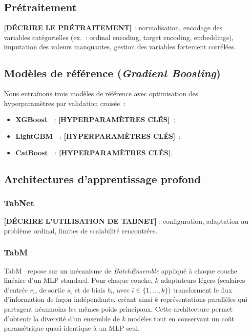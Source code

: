 \documentclass[conference]{IEEEtran}
\begin{document}
\subsection{Prétraitement}

\textbf{[DÉCRIRE LE PRÉTRAITEMENT]} : normalisation, encodage des variables catégorielles (ex.~: ordinal encoding, target encoding, embeddings), imputation des valeurs manquantes, gestion des variables fortement corrélées.

\subsection{Modèles de référence (\textit{Gradient Boosting})}

Nous entraînons trois modèles de référence avec optimisation des hyperparamètres par
validation croisée~:
\begin{itemize}
  \item \textbf{XGBoost}~\cite{chen2016xgboost}~: \textbf{[HYPERPARAMÈTRES CLÉS]}~;
  \item \textbf{LightGBM}~\cite{ke2017lightgbm}~: \textbf{[HYPERPARAMÈTRES CLÉS]}~;
  \item \textbf{CatBoost}~\cite{prokhorenkova2018catboost}~: \textbf{[HYPERPARAMÈTRES CLÉS]}.
\end{itemize}

\subsection{Architectures d'apprentissage profond}

\subsubsection{TabNet}
\textbf{[DÉCRIRE L'UTILISATION DE TABNET]} : configuration, adaptation au problème
ordinal, limites de scalabilité rencontrées.

\subsubsection{TabM}
TabM~\cite{gorishniy2024tabm} repose sur un mécanisme de \textit{BatchEnsemble} appliqué
à chaque couche linéaire d'un MLP standard. Pour chaque couche, $k$ adaptateurs légers
(scalaires d'entrée $r_i$, de sortie $s_i$ et de biais $b_i$, avec $i \in \{1,\ldots,k\}$)
transforment le flux d'information de façon indépendante, créant ainsi $k$ représentations
parallèles qui partagent néanmoins les mêmes poids principaux. Cette architecture permet
d'obtenir la diversité d'un ensemble de $k$ modèles tout en conservant un coût
paramétrique quasi-identique à un MLP seul.
\end{document}
